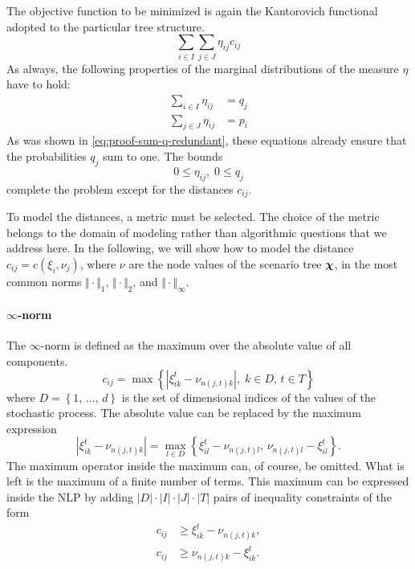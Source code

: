 The objective function to be minimized is again the Kantorovich functional adopted to the particular tree structure.
\begin{equation}
  \label{eq:NLP-derivation-objective}
  \sum_{i\in I}\sum_{j\in J} \eta_{ij} c_{ij}
\end{equation}
As always, the following properties of the marginal distributions of the measure $\eta$ have to hold:
\begin{subequations}
\begin{align}
  \label{eq:eta-nlp-marginal-q}
  \sum_{i\in I}\eta_{ij} &= q_j\\
  \label{eq:eta-nlp-marginal-p}
  \sum_{j\in J}\eta_{ij} &= p_i
\end{align}
\end{subequations}
As was shown in \eqref{eq:proof-sum-q-redundant}, these equations already ensure that the probabilities $q_j$ sum to one.
The bounds
\begin{equation}
  \label{eq:bounds-nlp-q-eta}
  0 \leq \eta_{ij},\; 0\leq q_j
\end{equation}
complete the problem except for the distances $c_{ij}$.

To model the distances, a metric must be selected. The choice of the metric belongs to the domain of modeling rather than algorithmic questions that we address here. In the following, we will show how to model the distance $c_{ij}=c(\xi_i,\nu_j)$, where $\nu$ are the node values of the scenario tree $\boldsymbol\chi$, in the most common norms $\Vert\cdot\Vert_1$, $\Vert\cdot\Vert_2$, and $\Vert\cdot\Vert_\infty$.
%
\paragraph{$\infty$-norm} The $\infty$-norm is defined as the maximum over the absolute value of all components.
\begin{equation}
  \label{eq:max-c-definition}
  c_{ij} = \max\left\{\left|\xi_{ik}^t-\nu_{n(j,t)k}\right|,\; k\in D,\, t\in T\right\}\nonumber
\end{equation}
where $D=\left\{1,\, ...,\,d\right\}$ is the set of dimensional indices of the values of the stochastic process. The absolute value can be replaced by the maximum expression
\begin{equation}
  \label{eq:abs-is-a-max}
  \left|\xi_{ik}^t-\nu_{n(j,t)k}\right| = \max\limits_{l\in D}\left\{\xi_{il}^t-\nu_{n(j,t)l},\, \nu_{n(j,t)l}-\xi_{il}^t\right\}.\nonumber
\end{equation}
The maximum operator inside the maximum can, of course, be omitted. What is left is the maximum of a finite number of terms. This maximum can be expressed inside the NLP by adding $ |D| \cdot |I|\cdot |J|\cdot |T|$ pairs of inequality constraints of the form
\begin{subequations}
\begin{align}
  \label{eq:c-as-inftynorm}
  c_{ij} &\geq \xi_{ik}^t - \nu_{n(j,t)k},\\
  c_{ij} &\geq \nu_{n(j,t)k} - \xi_{ik}^t.
\end{align}
\end{subequations}
